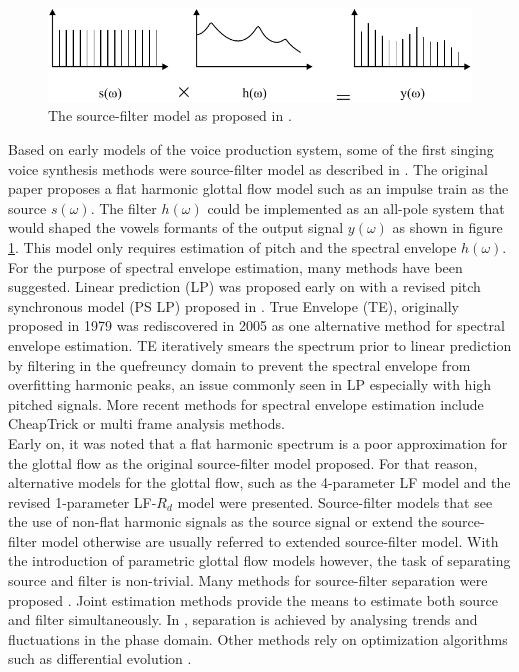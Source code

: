 \documentclass{article}
\begin{document}
\begin{figure}[H]
    \centering
    \includegraphics{Graphics/003_SourceFilter_1960.pdf}
    \caption{The source-filter model as proposed in \cite{fant_acoustic_1960}.}
    \label{fig:source_filter}
\end{figure}

Based on early models of the voice production system, some of the first singing voice synthesis methods were source-filter model as described in \cite{fant_acoustic_1960}. The original paper proposes a flat harmonic glottal flow model such as an impulse train as the source $s(\omega)$. The filter $h(\omega)$ could be implemented as an all-pole system that would shaped the vowels formants of the output signal $y(\omega)$ as shown in figure \ref{fig:source_filter}. This model only requires estimation of pitch and the spectral envelope $h(\omega)$. For the purpose of spectral envelope estimation, many methods have been suggested. Linear prediction (LP) was proposed early on \cite{makhoul_linear_1975} with a revised pitch synchronous model (PS LP) proposed in \cite{guerchi_pitch-synchronous_2000}. True Envelope (TE), originally proposed in 1979 \cite{imai_spectral_1979} was rediscovered in 2005 \cite{roebel_efficient_2005}\cite{villavicencio_improving_2006} as one alternative method for spectral envelope estimation. TE iteratively smears the spectrum prior to linear prediction by filtering in the quefreuncy domain to prevent the spectral envelope from overfitting harmonic peaks, an issue commonly seen in LP especially with high pitched signals. More recent methods for spectral envelope estimation include CheapTrick \cite{morise_cheaptrick_2015} or multi frame analysis methods\cite{degottex_simple_2016}.\\

Early on, it was noted that a flat harmonic spectrum is a poor approximation for the glottal flow as the original source-filter model proposed. For that reason, alternative models for the glottal flow, such as the 4-parameter LF model \cite{fant_four-parameter_1985} and the revised 1-parameter LF-$R_d$ model \cite{fant_lf-model_1995} were presented. Source-filter models that see the use of non-flat harmonic signals as the source signal or extend the source-filter model otherwise are usually referred to extended source-filter model. With the introduction of parametric glottal flow models however, the task of separating source and filter is non-trivial. Many methods for source-filter separation were proposed \cite{jinachitra_joint_2005}\cite{degottex_glottal_2010}\cite{perrotin_spectral_2019}. Joint estimation methods provide the means to estimate both source and filter simultaneously. In \cite{loweimi_source-filter_2015}, separation is achieved by analysing trends and fluctuations in the phase domain. Other methods rely on optimization algorithms such as differential evolution \cite{schleusing_joint_2013}.\\
\end{document}
